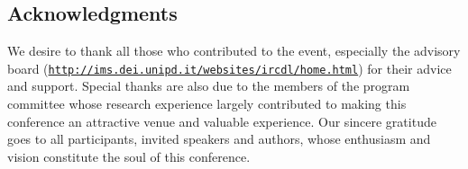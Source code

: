 \documentclass{sig-alternate-10pt}
\begin{document}
\subsection*{Acknowledgments}
We desire to thank all those who contributed to the
event, especially the advisory board (\texttt{\url{http://ims.dei.unipd.it/websites/ircdl/home.html}}) for their advice and support. Special thanks
are also due to the members of the program committee whose research experience largely contributed
to making this conference an attractive venue and
valuable experience. Our sincere gratitude goes to
all participants, invited speakers and authors, whose
enthusiasm and vision constitute the soul of this
conference.


%


\end{document}
